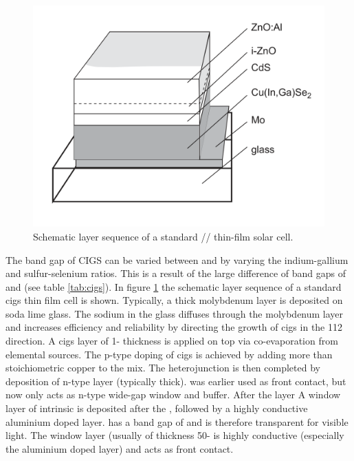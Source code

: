 \begin{figure}[tbh]
	\includegraphics[width=\textwidth]{./Pics/cigs.png}
    \caption{Schematic layer sequence of a standard // thin-film solar cell.\cite{rau2013cigs}}
	\label{fig:cigs}
\end{figure}

The band gap of CIGS can be varied between  and  by varying the indium-gallium and sulfur-selenium ratios.
This is a result of the large difference of band gaps of  and  (see table \ref{tab:cigs}). 
In figure \ref{fig:cigs} the schematic layer sequence of a standard \gls{cigs} thin film cell is shown. 
Typically, a  thick molybdenum layer is deposited on soda lime glass. 
The sodium in the glass diffuses through the molybdenum layer and increases efficiency and reliability by directing the growth of \gls{cigs} in the 112 direction\cite{hedstrom1993cigs}.
A \gls{cigs} layer of 1- thickness is applied on top via co-evaporation from elemental sources\cite{hedstrom1993cigs}.
The p-type doping of \gls{cigs} is achieved by adding more than stoichiometric copper to the mix. 
The heterojunction is then completed by deposition of  n-type layer (typically  thick).
 was earlier used as front contact, but now only acts as n-type wide-gap window and buffer. 
After the  layer 
A window layer of intrinsic  is deposited after the , followed by a highly conductive aluminium doped layer. 
 has a band gap of  and is therefore transparent for visible light. 
The  window layer (usually of thickness 50- is highly conductive (especially the aluminium doped layer) and acts as front contact. 

